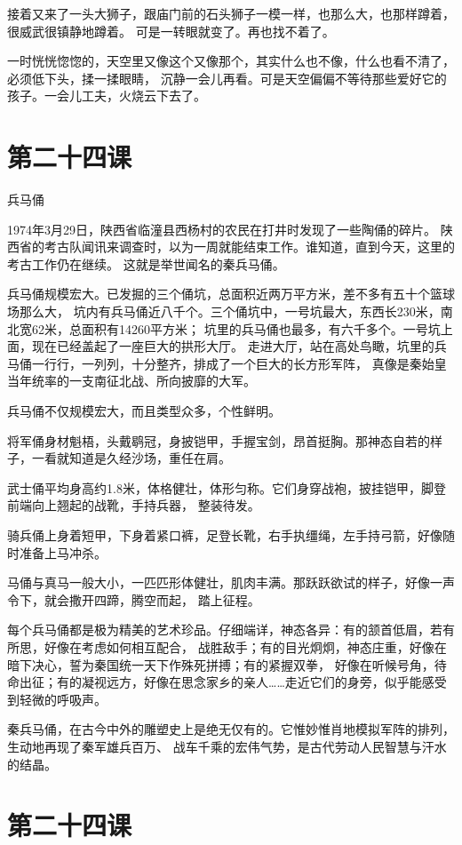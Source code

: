 \documentclass[12pt,UTF8]{ctexbook}
\begin{document}
接着又来了一头大狮子，跟庙门前的石头狮子一模一样，也那么大，也那样蹲着，很威武很镇静地蹲着。
可是一转眼就变了。再也找不着了。

一时恍恍惚惚的，天空里又像这个又像那个，其实什么也不像，什么也看不清了，必须低下头，揉一揉眼睛，
沉静一会儿再看。可是天空偏偏不等待那些爱好它的孩子。一会儿工夫，火烧云下去了。

\section{第二十四课}

兵马俑

1974年3月29日，陕西省临潼县西杨村的农民在打井时发现了一些陶俑的碎片。
陕西省的考古队闻讯来调查时，以为一周就能结束工作。谁知道，直到今天，这里的考古工作仍在继续。
这就是举世闻名的秦兵马俑。

兵马俑规模宏大。已发掘的三个俑坑，总面积近两万平方米，差不多有五十个篮球场那么大，
坑内有兵马俑近八千个。三个俑坑中，一号坑最大，东西长230米，南北宽62米，总面积有14260平方米；
坑里的兵马俑也最多，有六千多个。一号坑上面，现在已经盖起了一座巨大的拱形大厅。
走进大厅，站在高处鸟瞰，坑里的兵马俑一行行，一列列，十分整齐，排成了一个巨大的长方形军阵，
真像是秦始皇当年统率的一支南征北战、所向披靡的大军。

兵马俑不仅规模宏大，而且类型众多，个性鲜明。

将军俑身材魁梧，头戴鹖冠，身披铠甲，手握宝剑，昂首挺胸。那神态自若的样子，一看就知道是久经沙场，重任在肩。

武士俑平均身高约1.8米，体格健壮，体形匀称。它们身穿战袍，披挂铠甲，脚登前端向上翘起的战靴，手持兵器，
整装待发。

骑兵俑上身着短甲，下身着紧口裤，足登长靴，右手执缰绳，左手持弓箭，好像随时准备上马冲杀。

马俑与真马一般大小，一匹匹形体健壮，肌肉丰满。那跃跃欲试的样子，好像一声令下，就会撒开四蹄，腾空而起，
踏上征程。

每个兵马俑都是极为精美的艺术珍品。仔细端详，神态各异：有的颔首低眉，若有所思，好像在考虑如何相互配合，
战胜敌手；有的目光炯炯，神态庄重，好像在暗下决心，誓为秦国统一天下作殊死拼搏；有的紧握双拳，
好像在听候号角，待命出征；有的凝视远方，好像在思念家乡的亲人……走近它们的身旁，似乎能感受到轻微的呼吸声。

秦兵马俑，在古今中外的雕塑史上是绝无仅有的。它惟妙惟肖地模拟军阵的排列，生动地再现了秦军雄兵百万、
战车千乘的宏伟气势，是古代劳动人民智慧与汗水的结晶。

\section{第二十四课}
\end{document}
